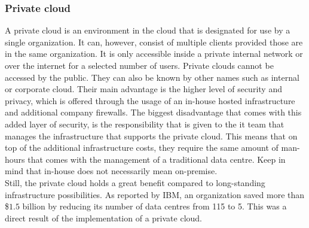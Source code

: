 \subsubsection{Private cloud}
A private cloud is an environment in the cloud that is designated for use by a single organization. 
It can, however, consist of multiple clients provided those are in the same organization. 
It is only accessible inside a private internal network or over the internet for a selected number of users. 
Private clouds cannot be accessed by the public. 
They can also be known by other names such as internal or corporate cloud. 
Their main advantage is the higher level of security and privacy, which is offered through the usage of an in-house hosted infrastructure and additional company firewalls. 
The biggest disadvantage that comes with this added layer of security, is the responsibility that is given to the \acrshort{it} team that manages the infrastructure that supports the private cloud. 
This means that on top of the additional infrastructure costs, they require the same amount of man-hours that comes with the management of a traditional data centre. 
Keep in mind that in-house does not necessarily mean on-premise.
\\
Still, the private cloud holds a great benefit compared to long-standing infrastructure possibilities. 
As reported by IBM, an organization saved more than \${$1.5$} billion by reducing its number of data centres from 115 to 5. 
This was a direct result of the implementation of a private cloud. \autocite{Hofmann2010} 


